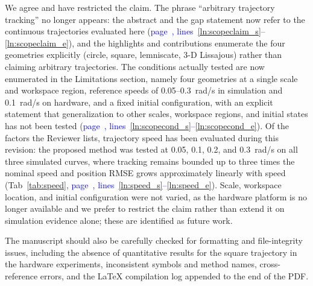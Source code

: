 \documentclass[11pt]{elsarticle}
\newcommand{\mlines}[2]{\textcolor{blue}{page~\pageref{#1}, lines~\ref{#1}--\ref{#2}}}
\begin{document}
\begin{responsebox}
We agree and have restricted the claim. The phrase ``arbitrary trajectory tracking'' no longer appears: the abstract and the gap statement now refer to the continuous trajectories evaluated here (\mlines{ln:scopeclaim_s}{ln:scopeclaim_e}), and the highlights and contributions enumerate the four geometries explicitly (circle, square, lemniscate, 3-D Lissajous) rather than claiming arbitrary trajectories. The conditions actually tested are now enumerated in the Limitations section, namely four geometries at a single scale and workspace region, reference speeds of 0.05--0.3~rad/s in simulation and 0.1~rad/s on hardware, and a fixed initial configuration, with an explicit statement that generalization to other scales, workspace regions, and initial states has not been tested (\mlines{ln:scopecond_s}{ln:scopecond_e}). Of the factors the Reviewer lists, trajectory speed has been evaluated during this revision: the proposed method was tested at 0.05, 0.1, 0.2, and 0.3~rad/s on all three simulated curves, where tracking remains bounded up to three times the nominal speed and position RMSE grows approximately linearly with speed (Tab~\ref{tab:speed}, \mlines{ln:speed_s}{ln:speed_e}). Scale, workspace location, and initial configuration were not varied, as the hardware platform is no longer available and we prefer to restrict the claim rather than extend it on simulation evidence alone; these are identified as future work.
\end{responsebox}

\begin{reviewerbox}[Comment R1.12]
The manuscript should also be carefully checked for formatting and file-integrity issues, including the absence of quantitative results for the square trajectory in the hardware experiments, inconsistent symbols and method names, cross-reference errors, and the LaTeX compilation log appended to the end of the PDF.
\end{reviewerbox}
\end{document}
